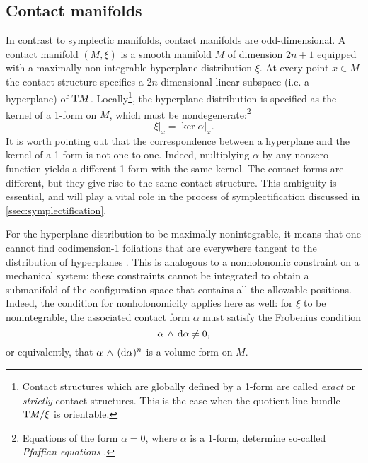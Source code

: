 \subsection{Contact manifolds}
\label{ssec:contact_manifolds}
In contrast to symplectic manifolds, contact manifolds are odd-dimensional. A contact manifold \((M, \xi)\) is a smooth manifold \(M\) of dimension \(2n + 1\) equipped with a maximally non-integrable hyperplane distribution \(\xi\). At every point \(x \in M\) the contact structure specifies a \(2n\)-dimensional linear subspace (i.e. a hyperplane) of \(\mathrm{T}M\). Locally\footnote
{
    Contact structures which are globally defined by a 1-form are called \emph{exact} or \emph{strictly} contact structures. This is the case when the quotient line bundle \( \mathrm{T}M/\xi\) is orientable. 
}, the hyperplane distribution is specified as the kernel of a 1-form on \(M\), which must be nondegenerate:\footnote{Equations of the form \( \alpha = 0\), where \(\alpha\) is a 1-form, determine so-called \emph{Pfaffian equations} \cite{Libermann1987}.} \cite{Geiges2008, Arnold1989, Cannas2001}
\begin{equation}
     \xi\vert_x = \ker{\alpha}\vert_x.
\end{equation}
It is worth pointing out that the correspondence between a hyperplane and the kernel of a 1-form is not one-to-one. Indeed, multiplying \(\alpha\) by any nonzero function yields a different 1-form with the same kernel. The contact forms are different, but they give rise to the same contact structure. This ambiguity is essential, and will play a vital role in the process of symplectification discussed in \cref{ssec:symplectification}.

For the hyperplane distribution to be maximally nonintegrable, it means that one cannot find codimension-1 foliations that are everywhere tangent to the distribution of hyperplanes \cite{Geiges2008}. This is analogous to a nonholonomic constraint on a mechanical system: these constraints cannot be integrated to obtain a submanifold of the configuration space that contains all the allowable positions. Indeed, the condition for nonholonomicity applies here as well: for \(\xi\) to be nonintegrable, the associated contact form \(\alpha\) must satisfy the Frobenius condition 
\begin{equation}
      \alpha\,\wedge\,\dd{\alpha}  \neq 0,
\end{equation}
or equivalently, that \( \alpha\,\wedge\,(\dd{\alpha})^n \) is a volume form on \(M\). 

